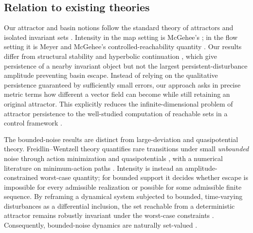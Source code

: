 \documentclass[pdflatex,sn-mathphys-num]{sn-jnl}
\numberwithin{equation}{section}
\theoremstyle{thmstyleone}%
\theoremstyle{definition}
\theoremstyle{remark}
\begin{document}
\subsection{Relation to existing theories}
\label{subsec:intro-literature}

Our attractor and basin notions follow the standard theory of attractors and isolated invariant sets \citep{conley1978isolated,hurley1982attractors,wang2026damage,milnor1985concept,norton1995fundamental}. Intensity in the map setting is McGehee's \citep{mcgehee1988some}; in the flow setting it is Meyer and McGehee's controlled-reachability quantity \citep{meyer2022intensity}. Our results differ from structural stability and hyperbolic continuation \citep{hirsch1970invariant,robinson1998dynamical,wang2026breakdown}, which give persistence of a nearby invariant object but not the largest persistent-disturbance amplitude preventing basin escape. Instead of relying on the qualitative persistence guaranteed by sufficiently small errors, our approach asks in precise metric terms how different a vector field can become while still retaining an original attractor. This explicitly reduces the infinite-dimensional problem of attractor persistence to the well-studied computation of reachable sets in a control framework \citep{baier2013approximation,yu2026pattern,de2011level}.

The bounded-noise results are distinct from large-deviation and quasipotential theory. Freidlin--Wentzell theory quantifies rare transitions under small \emph{unbounded} noise through action minimization and quasipotentials
\citep{freidlinrandom,kifer1988random,dembo2009large,berglund2006noise}, with a numerical literature on minimum-action paths \citep{heymann2008geometric,cameron2012finding,grafke2019numerical,liu2025bidirectional}. Intensity is instead an amplitude-constrained worst-case quantity; for bounded support it decides whether escape is impossible for every admissible realization or possible for some admissible finite sequence. By reframing a dynamical system subjected to bounded, time-varying disturbances as a differential inclusion, the set reachable from a deterministic attractor remains robustly invariant under the worst-case constraints \citep{thieme2022conley}. Consequently, bounded-noise dynamics are naturally set-valued \citep{zmarrou2007bifurcations,botts2012hopf,callaway2017dichotomy}. 
\end{document}
